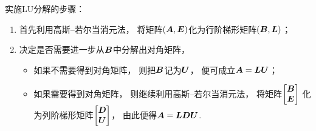 实施LU分解的步骤：\begin{enumerate}
	\item 首先利用高斯--若尔当消元法，
	将矩阵\((\boldsymbol{A},\boldsymbol{E})\)化为行阶梯形矩阵\((\boldsymbol{B},\boldsymbol{L})\)；

	\item 决定是否需要进一步从\(\boldsymbol{B}\)中分解出对角矩阵，\begin{itemize}
		\item 如果不需要得到对角矩阵，
		则把\(\boldsymbol{B}\)记为\(\boldsymbol{U}\)，
		便可成立\(\boldsymbol{A} = \boldsymbol{L} \boldsymbol{U}\)；

		\item 如果需要得到对角矩阵，
		则继续利用高斯--若尔当消元法，
		将矩阵\(\begin{bmatrix}
			\boldsymbol{B} \\
			\boldsymbol{E}
		\end{bmatrix}\)
		化为列阶梯形矩阵\(\begin{bmatrix}
			\boldsymbol{D} \\
			\boldsymbol{U}
		\end{bmatrix}\)，
		由此便得\(\boldsymbol{A} = \boldsymbol{L} \boldsymbol{D} \boldsymbol{U}\).
	\end{itemize}
\end{enumerate}

